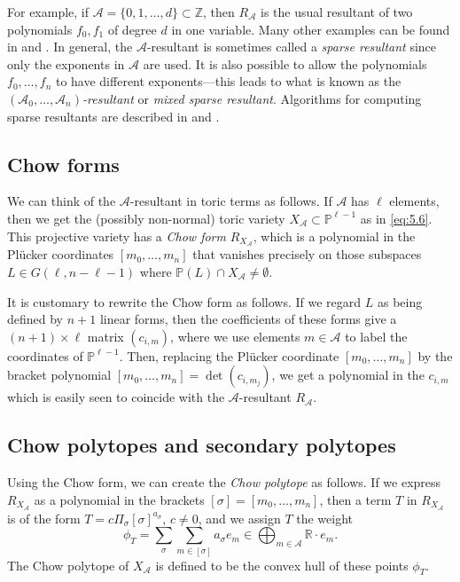 \documentclass{amsart}
\theoremstyle{plain}
\theoremstyle{definition}
\begin{document}
	For example, if $\mathcal{A} = \{0,1,\ldots,d\} \subset \mathbb{Z}$,
then $R_{\mathcal{A}}$ is the usual resultant of two polynomials $f_0,f_1$
of degree $d$ in one variable.  Many other examples can be found in
\cite{GKZ3} and \cite{Stu4}.  In general, the $\mathcal{A}$-resultant
is sometimes called a {\it sparse resultant\/} since only the
exponents in $\mathcal{A}$ are used.  It is also possible to allow the
polynomials $f_0,\dots,f_n$ to have different exponents---this leads
to what is known as the {\it
$(\mathcal{A}_0,\dots,\mathcal{A}_n)$-resultant\/} or {\it mixed sparse
resultant\/}.  Algorithms for computing sparse resultants are
described in \cite{CE} and \cite{Stu4}.

	\subsection{Chow forms} We can think of the
$\mathcal{A}$-resultant in toric terms as follows.  If $\mathcal{A}$ has
$\ell$ elements, then we get the (possibly non-normal) toric
variety $X_{\mathcal{A}} \subset \mathbb{P}^{\ell-1}$ as in \eqref{eq:5.6}.
This projective variety has a {\it Chow form\/} $R_{X_{\mathcal{A}}}$,
which is a polynomial in the Pl\"ucker coordinates $[m_0,\dots,m_n]$
that vanishes precisely on those subspaces $L \in G(\ell,n-\ell-1)$
where $\mathbb{P}(L)\cap X_{\mathcal{A}} \ne \emptyset$.  

	It is customary to rewrite the Chow form as follows.  If we
regard $L$ as being defined by $n+1$ linear forms, then the
coefficients of these forms give a $(n+1)\times\ell$ matrix
$(c_{i,m})$, where we use elements $m \in \mathcal{A}$ to label the
coordinates of $\mathbb{P}^{\ell-1}$.  Then, replacing the Pl\"ucker
coordinate $[m_0,\dots,m_n]$ by the bracket polynomial
$[m_0,\dots,m_n] = \det(c_{i,m_j})$, we get a polynomial in the
$c_{i,m}$ which is easily seen to coincide with the
$\mathcal{A}$-resultant $R_{\mathcal{A}}$.

	\subsection{Chow polytopes and secondary polytopes}
Using the Chow form, we can create the {\it Chow polytope\/} as
follows.  If we express $R_{X_{\mathcal{A}}}$ as a polynomial in the
brackets $[\sigma] = [m_0,\dots,m_n]$, then a term $T$ in
$R_{X_{\mathcal{A}}}$ is of the form $T = c\Pi_\sigma
[\sigma]^{a_\sigma}$, $c \ne 0$, and we assign $T$ the weight
\[
\phi_T = \sum_\sigma \sum_{m \in [\sigma]} a_\sigma e_{m} \in
{\textstyle{\bigoplus_{m\in\mathcal{A}}}} \mathbb{R}\cdot e_m. 
\]
The Chow polytope of $X_{\mathcal{A}}$ is defined to be the convex hull of
these points $\phi_T$.
\end{document}
